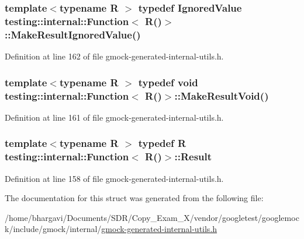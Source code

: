 \subsubsection[{\texorpdfstring{Make\+Result\+Ignored\+Value}{MakeResultIgnoredValue}}]{\setlength{\rightskip}{0pt plus 5cm}template$<$typename R $>$ typedef {\bf Ignored\+Value} {\bf testing\+::internal\+::\+Function}$<$ {\bf R}()$>$\+::Make\+Result\+Ignored\+Value()}\hypertarget{structtesting_1_1internal_1_1_function_3_01_r_07_08_4_aa459093a5b52ef54e2544b5a6c054383}{}\label{structtesting_1_1internal_1_1_function_3_01_r_07_08_4_aa459093a5b52ef54e2544b5a6c054383}


Definition at line 162 of file gmock-\/generated-\/internal-\/utils.\+h.

\subsubsection[{\texorpdfstring{Make\+Result\+Void}{MakeResultVoid}}]{\setlength{\rightskip}{0pt plus 5cm}template$<$typename R $>$ typedef void {\bf testing\+::internal\+::\+Function}$<$ {\bf R}()$>$\+::Make\+Result\+Void()}\hypertarget{structtesting_1_1internal_1_1_function_3_01_r_07_08_4_a666b5ad3bf155529d3a0f9fe6d5c897b}{}\label{structtesting_1_1internal_1_1_function_3_01_r_07_08_4_a666b5ad3bf155529d3a0f9fe6d5c897b}


Definition at line 161 of file gmock-\/generated-\/internal-\/utils.\+h.

\subsubsection[{\texorpdfstring{Result}{Result}}]{\setlength{\rightskip}{0pt plus 5cm}template$<$typename R $>$ typedef {\bf R} {\bf testing\+::internal\+::\+Function}$<$ {\bf R}()$>$\+::{\bf Result}}\hypertarget{structtesting_1_1internal_1_1_function_3_01_r_07_08_4_a5c228a886ef598ac10988f8de5e32ca1}{}\label{structtesting_1_1internal_1_1_function_3_01_r_07_08_4_a5c228a886ef598ac10988f8de5e32ca1}


Definition at line 158 of file gmock-\/generated-\/internal-\/utils.\+h.



The documentation for this struct was generated from the following file\+:\begin{DoxyCompactItemize}
\item 
/home/bhargavi/\+Documents/\+S\+D\+R/\+Copy\+\_\+\+Exam\+\_\+X/vendor/googletest/googlemock/include/gmock/internal/\hyperlink{gmock-generated-internal-utils_8h}{gmock-\/generated-\/internal-\/utils.\+h}\end{DoxyCompactItemize}

